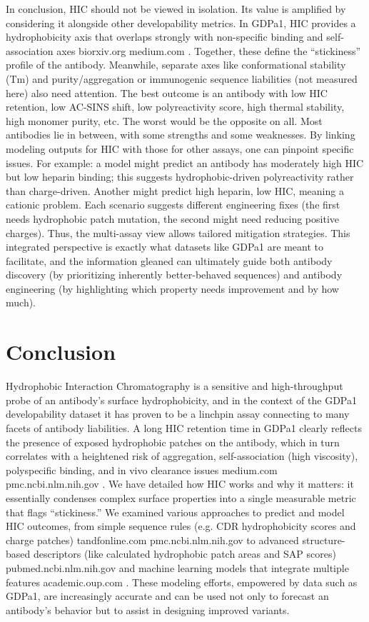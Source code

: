 \documentclass[12pt]{article}
\begin{document}
In conclusion, HIC should not be viewed in isolation. Its value is amplified by considering it alongside other developability metrics. In GDPa1, HIC provides a hydrophobicity axis that overlaps strongly with non-specific binding and self-association axes
biorxiv.org
medium.com
. Together, these define the “stickiness” profile of the antibody. Meanwhile, separate axes like conformational stability (Tm) and purity/aggregation or immunogenic sequence liabilities (not measured here) also need attention. The best outcome is an antibody with low HIC retention, low AC-SINS shift, low polyreactivity score, high thermal stability, high monomer purity, etc. The worst would be the opposite on all. Most antibodies lie in between, with some strengths and some weaknesses. By linking modeling outputs for HIC with those for other assays, one can pinpoint specific issues. For example: a model might predict an antibody has moderately high HIC but low heparin binding; this suggests hydrophobic-driven polyreactivity rather than charge-driven. Another might predict high heparin, low HIC, meaning a cationic problem. Each scenario suggests different engineering fixes (the first needs hydrophobic patch mutation, the second might need reducing positive charges). Thus, the multi-assay view allows tailored mitigation strategies. This integrated perspective is exactly what datasets like GDPa1 are meant to facilitate, and the information gleaned can ultimately guide both antibody discovery (by prioritizing inherently better-behaved sequences) and antibody engineering (by highlighting which property needs improvement and by how much).

\section{Conclusion}
Hydrophobic Interaction Chromatography is a sensitive and high-throughput probe of an antibody’s surface hydrophobicity, and in the context of the GDPa1 developability dataset it has proven to be a linchpin assay connecting to many facets of antibody liabilities. A long HIC retention time in GDPa1 clearly reflects the presence of exposed hydrophobic patches on the antibody, which in turn correlates with a heightened risk of aggregation, self-association (high viscosity), polyspecific binding, and in vivo clearance issues
medium.com
pmc.ncbi.nlm.nih.gov
. We have detailed how HIC works and why it matters: it essentially condenses complex surface properties into a single measurable metric that flags “stickiness.” We examined various approaches to predict and model HIC outcomes, from simple sequence rules (e.g. CDR hydrophobicity scores and charge patches)
tandfonline.com
pmc.ncbi.nlm.nih.gov
 to advanced structure-based descriptors (like calculated hydrophobic patch areas and SAP scores)
pubmed.ncbi.nlm.nih.gov
 and machine learning models that integrate multiple features
academic.oup.com
. These modeling efforts, empowered by data such as GDPa1, are increasingly accurate and can be used not only to forecast an antibody’s behavior but to assist in designing improved variants.
\end{document}
